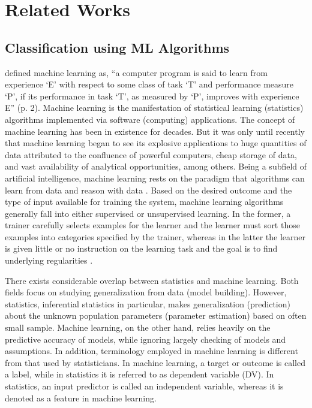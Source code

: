 \documentclass[deca,blindrev]{informs3}
\begin{document}
\section{Related Works }

\subsection{Classification using ML Algorithms}

\cite{mitchell1997machine}  defined machine learning as, ``a  computer program is said to learn from experience ‘E’ with respect to some class of task ‘T’ and performance measure ‘P’, if its performance in task ‘T’, as measured by ‘P’, improves with experience E'' (p. 2). Machine learning is the manifestation of statistical learning (statistics) algorithms implemented via software (computing) applications. The concept of machine learning has been in existence for decades. But it was only until recently that machine learning began to see its explosive applications to huge quantities of data attributed to the confluence of powerful computers, cheap storage of data, and vast availability of analytical opportunities, among others. Being a subfield of artificial intelligence, machine learning rests on the paradigm that algorithms can learn from data and reason with data \citep{rao2013handbook}. Based on the desired outcome and the type of input available for training the system, machine learning algorithms generally fall into either supervised or unsupervised learning.  In the former, a trainer carefully selects examples for the learner and the learner must sort those examples into categories specified by the trainer, whereas in the latter the learner is given little or no instruction on the learning task and the goal is to find underlying regularities \citep{cottrell2006new}.

There exists considerable overlap between statistics and machine learning. Both fields focus on studying generalization from data (model building). However, statistics, inferential statistics in particular, makes generalization (prediction) about the unknown population parameters (parameter estimation) based on often small sample. Machine learning, on the other hand, relies heavily on the predictive accuracy of models, while ignoring largely checking of models and assumptions. In addition, terminology employed in machine learning is different from that used by statisticians. In machine learning, a target or outcome is called a label, while in statistics it is referred to as dependent variable (DV). In statistics, an input predictor is called an independent variable, whereas it is denoted as a feature in machine learning.  
\end{document}
